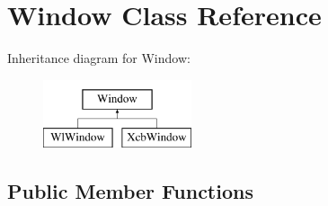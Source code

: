 \hypertarget{classWindow}{}\section{Window Class Reference}
\label{classWindow}
Inheritance diagram for Window\+:\begin{figure}[H]
\begin{center}
\leavevmode
\includegraphics[height=2.000000cm]{classWindow}
\end{center}
\end{figure}
\subsection*{Public Member Functions}
